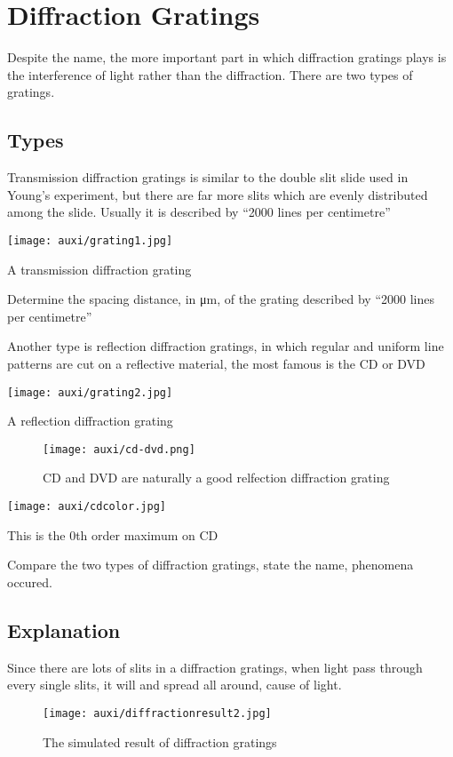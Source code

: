 \documentclass[a4paper]{tufte-handout}
\newenvironment{TaskBox} %
{\begin{tcolorbox}[breakable,colback=b1!30,colframe=b1,title=Task]} {\end{tcolorbox}}
\begin{document}
\section{Diffraction Gratings}
Despite the name, the more important part in which diffraction gratings plays is the interference of light rather than the diffraction. There are two types of gratings.

\subsection{Types}
Transmission diffraction gratings is similar to the double slit slide used in Young's experiment, but there are far more slits which are evenly distributed among the slide. Usually it is described by ``2000 lines per centimetre''
\begin{marginfigure}
\centering
\texttt{[image: auxi/grating1.jpg]}
\caption{A transmission diffraction grating}
\end{marginfigure}
\begin{TaskBox}
Determine the spacing distance, in \si{\micro\meter}, of the grating described by ``2000 lines per centimetre''
\end{TaskBox}

Another type is reflection diffraction gratings, in which regular and uniform line patterns are cut on a reflective material, the most famous is the CD or DVD
\begin{marginfigure}[3cm]
\centering
\texttt{[image: auxi/grating2.jpg]}
\caption{A reflection diffraction grating}
\end{marginfigure}

\begin{figure}[h]
\centering
\texttt{[image: auxi/cd-dvd.png]}
\caption{CD and DVD are naturally a good relfection diffraction grating}
\end{figure}

\begin{marginfigure}
\centering
\texttt{[image: auxi/cdcolor.jpg]}
\caption{This is the 0th order  maximum on CD}
\end{marginfigure}

\begin{TaskBox}
Compare the two types of diffraction gratings, state the name, phenomena occured.
\tcblower
\vspace{1in} 
\end{TaskBox}

\subsection{Explanation}
Since there are lots of slits in a diffraction gratings, when light pass through every single slits, it will \uline{\hspace{1in}} and spread all around, cause \uline{\hspace{1in}} of light. 
\begin{figure}[h]
\centering
\texttt{[image: auxi/diffractionresult2.jpg]}
\caption{The simulated result of diffraction gratings}
\end{figure}
\end{document}
